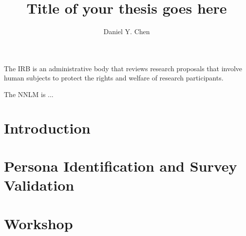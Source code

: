 \documentclass[doublespace,draft,nopageskip]{VTthesis} %
\title{Title of your thesis goes here}
\author{Daniel Y. Chen}
\begin{document}
  \frontmatter
  \maketitle
  \tableofcontents

	\listoffigures
	\listoftables
    \printnomenclature %

%
%
%

The IRB is an administrative body that reviews research proposals that involve human subjects to protect the rights and welfare of
research participants.


The NNLM is ... %


	\mainmatter

	\chapter{Introduction} \label{ch:introduction}
        

    \chapter{Persona Identification and Survey Validation} \label{ch:persona_validation}
        

    \chapter{Workshop} \label{ch:workshop}
        
\end{document}
